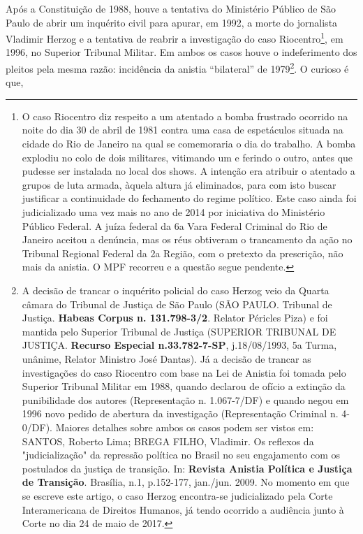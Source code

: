 Após a Constituição de 1988, houve a tentativa do Ministério Público de
São Paulo de abrir um inquérito civil para apurar, em 1992, a morte do
jornalista Vladimir Herzog e a tentativa de reabrir a investigação do
caso Riocentro\footnote{O caso Riocentro diz respeito a um atentado a
  bomba frustrado ocorrido na noite do dia 30 de abril de 1981 contra
  uma casa de espetáculos situada na cidade do Rio de Janeiro na qual se
  comemoraria o dia do trabalho. A bomba explodiu no colo de dois
  militares, vitimando um e ferindo o outro, antes que pudesse ser
  instalada no local dos shows. A intenção era atribuir o atentado a
  grupos de luta armada, àquela altura já eliminados, para com isto
  buscar justificar a continuidade do fechamento do regime político.
  Este caso ainda foi judicializado uma vez mais no ano de 2014 por
  iniciativa do Ministério Público Federal. A juíza federal da 6a Vara
  Federal Criminal do Rio de Janeiro aceitou a denúncia, mas os réus
  obtiveram o trancamento da ação no Tribunal Regional Federal da 2a
  Região, com o pretexto da prescrição, não mais da anistia. O MPF
  recorreu e a questão segue pendente.}, em 1996, no Superior Tribunal
Militar. Em ambos os casos houve o indeferimento dos pleitos pela mesma
razão: incidência da anistia ``bilateral'' de 1979\footnote{A decisão de
  trancar o inquérito policial do caso Herzog veio da Quarta câmara do
  Tribunal de Justiça de São Paulo (SÃO PAULO. Tribunal de Justiça.
  \textbf{Habeas Corpus n. 131.798-3/2}. Relator Péricles Piza) e foi
  mantida pelo Superior Tribunal de Justiça (SUPERIOR TRIBUNAL DE
  JUSTIÇA. \textbf{Recurso Especial n.33.782-7-SP}, j.18/08/1993, 5a
  Turma, unânime, Relator Ministro José Dantas). Já a decisão de trancar
  as investigações do caso Riocentro com base na Lei de Anistia foi
  tomada pelo Superior Tribunal Militar em 1988, quando declarou de
  ofício a extinção da punibilidade dos autores (Representação n.
  1.067-7/DF) e quando negou em 1996 novo pedido de abertura da
  investigação (Representação Criminal n. 4-0/DF). Maiores detalhes
  sobre ambos os casos podem ser vistos em: SANTOS, Roberto Lima; BREGA
  FILHO, Vladimir. Os reflexos da "judicialização" da repressão política
  no Brasil no seu engajamento com os postulados da justiça de
  transição. In: \textbf{Revista Anistia Política e Justiça de
  Transição}. Brasília, n.1, p.152-177, jan./jun. 2009. No momento em
  que se escreve este artigo, o caso Herzog encontra-se judicializado
  pela Corte Interamericana de Direitos Humanos, já tendo ocorrido a
  audiência junto à Corte no dia 24 de maio de 2017.}. O curioso é que,
